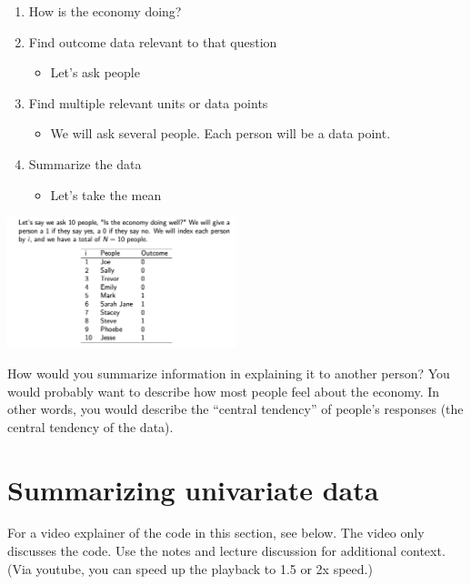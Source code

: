 \documentclass[
  letterpaper,
  DIV=11,
  numbers=noendperiod]{scrreprt}
\providecommand{\tightlist}{%
  \setlength{\itemsep}{0pt}\setlength{\parskip}{0pt}}\usepackage{longtable,booktabs,array}
\begin{document}
\begin{enumerate}
\def\labelenumi{\arabic{enumi}.}
\tightlist
\item
  How is the economy doing?
\item
  Find outcome data relevant to that question

  \begin{itemize}
  \tightlist
  \item
    Let's ask people
  \end{itemize}
\item
  Find multiple relevant units or data points

  \begin{itemize}
  \tightlist
  \item
    We will ask several people. Each person will be a data point.
  \end{itemize}
\item
  Summarize the data

  \begin{itemize}
  \tightlist
  \item
    Let's take the mean
  \end{itemize}
\end{enumerate}

\includegraphics[width=0.5\textwidth,height=\textheight]{images/economysurvey.png}

How would you summarize information in explaining it to another person?
You would probably want to describe how most people feel about the
economy. In other words, you would describe the ``central tendency'' of
people's responses (the central tendency of the data).

\hypertarget{summarizing-univariate-data}{%
\section{Summarizing univariate
data}\label{summarizing-univariate-data}}

For a video explainer of the code in this section, see below. The video
only discusses the code. Use the notes and lecture discussion for
additional context. (Via youtube, you can speed up the playback to 1.5
or 2x speed.)
\end{document}
